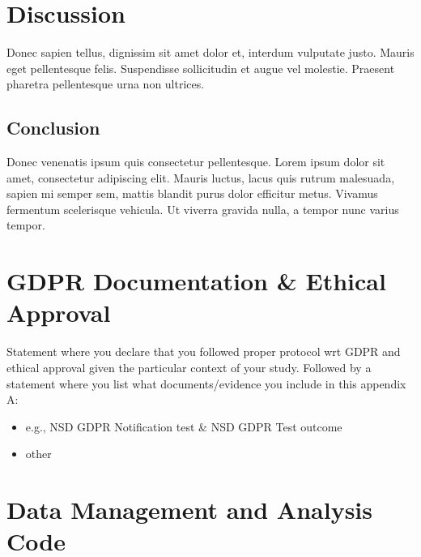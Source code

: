 \documentclass[a4paper,12pt,stu,donotrepeattitle,floatsintext,twoside]{apa7}
\begin{document}
\section{Discussion}

Donec sapien tellus, dignissim sit amet dolor et, interdum vulputate justo. Mauris eget pellentesque felis. Suspendisse sollicitudin et augue vel molestie. Praesent pharetra pellentesque urna non ultrices.

\subsection{Conclusion}

Donec venenatis ipsum quis consectetur pellentesque. Lorem ipsum dolor sit amet, consectetur adipiscing elit. Mauris luctus, lacus quis rutrum malesuada, sapien mi semper sem, mattis blandit purus dolor efficitur metus. Vivamus fermentum scelerisque vehicula. Ut viverra gravida nulla, a tempor nunc varius tempor.

\printbibliography



\appendix

\section{GDPR Documentation \& Ethical Approval}\label{app:A}

\appindent Statement where you declare that you followed proper protocol wrt GDPR and ethical approval given the particular context of your study. Followed by a statement where you list what documents/evidence you include in this appendix A:
\begin{itemize}
    \item e.g., NSD GDPR Notification test \& NSD GDPR Test outcome
    \item other
\end{itemize}




\section{Data Management and Analysis Code}\label{app:B}
\end{document}
